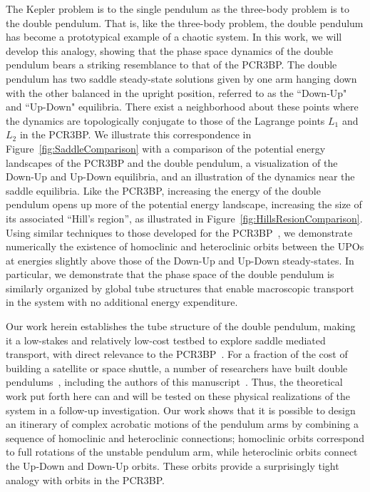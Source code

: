 \documentclass[11pt]{article}
\numberwithin{equation}{section}
\theoremstyle{plain}
\begin{document}
The Kepler problem is to the single pendulum as the three-body problem is to the double pendulum. That is, like the three-body problem, the double pendulum has become a prototypical example of a chaotic system. In this work, we will develop this analogy, showing that the phase space dynamics of the double pendulum bears a striking resemblance to that of the PCR3BP. The double pendulum has two saddle steady-state solutions given by one arm hanging down with the other balanced in the upright position, referred to as the ``Down-Up" and ``Up-Down" equilibria. 
There exist a neighborhood about these points where the dynamics are topologically conjugate to those of the Lagrange points $L_1$ and $L_2$ in the PCR3BP. We illustrate this correspondence in Figure~\ref{fig:SaddleComparison} with a comparison of the potential energy landscapes of the PCR3BP and the double pendulum, a visualization of the Down-Up and Up-Down equilibria, and an illustration of the dynamics near the saddle equilibria. Like the PCR3BP, increasing the energy of the double pendulum opens up more of the potential energy landscape, increasing the size of its associated ``Hill's region'', as illustrated in Figure~\ref{fig:HillsResionComparison}. Using similar techniques to those developed for the PCR3BP~\cite{Koon}, we demonstrate numerically the existence of homoclinic and heteroclinic orbits between the UPOs at energies slightly above those of the Down-Up and Up-Down steady-states. In particular, we demonstrate that the phase space of the double pendulum is similarly organized by global tube structures that enable macroscopic transport in the system with no additional energy expenditure.            

Our work herein establishes the tube structure of the double pendulum, making it a low-stakes and relatively low-cost testbed to explore saddle mediated transport, with direct relevance to the PCR3BP~\cite{Koon}. For a fraction of the cost of building a satellite or space shuttle, a number of researchers have built double pendulums~\cite{spong1995swing,fantoni2000energy,driver2004design,timmermann2011discrete,hesse2018reinforcement,DPChaos,christini1996experimental,myers2020low,rubi2002swing,rafat2009dynamics,freidovich2008periodic,kaheman2019learning}, including the authors of this manuscript~\cite{kaheman2022experimental}.
Thus, the theoretical work put forth here can and will be tested on these physical realizations of the system in a follow-up investigation. 
Our work shows that it is possible to design an itinerary of complex acrobatic motions of the pendulum arms by combining a sequence of homoclinic and heteroclinic connections; homoclinic orbits correspond to full rotations of the unstable pendulum arm, while heteroclinic orbits connect the Up-Down and Down-Up orbits.  
These orbits provide a surprisingly tight analogy with orbits in the PCR3BP. 
\end{document}
